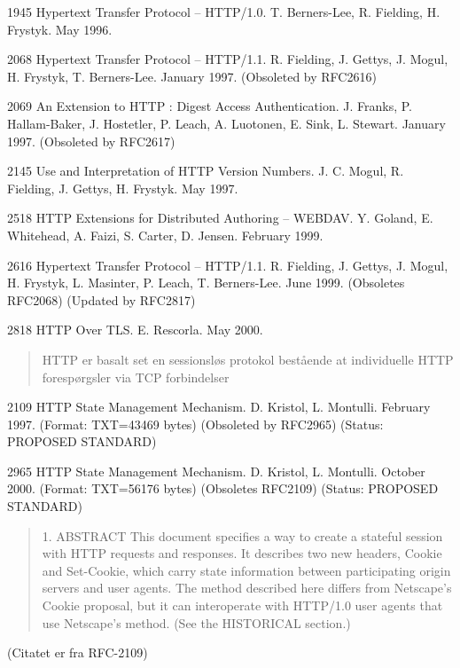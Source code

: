\documentclass[Screen16to9,17pt]{foils}
\begin{document}
\begin{list2}
\item[1945] Hypertext Transfer Protocol -- HTTP/1.0. T. Berners-Lee, R.
     Fielding, H. Frystyk. May 1996.
\item[2068] Hypertext Transfer Protocol -- HTTP/1.1. R. Fielding, J. Gettys,
     J. Mogul, H. Frystyk, T. Berners-Lee. January 1997. (Obsoleted by
     RFC2616)
\item[2069] An Extension to HTTP : Digest Access Authentication. J. Franks,
     P. Hallam-Baker, J. Hostetler, P. Leach, A. Luotonen, E. Sink, L.
     Stewart. January 1997. (Obsoleted by
     RFC2617)
\item[2145] Use and Interpretation of HTTP Version Numbers. J. C. Mogul, R.
     Fielding, J. Gettys, H. Frystyk. May 1997.
\item[2518] HTTP Extensions for Distributed Authoring -- WEBDAV. Y. Goland,
     E. Whitehead, A. Faizi, S. Carter, D. Jensen. February 1999.
\item[2616] Hypertext Transfer Protocol -- HTTP/1.1. R. Fielding, J. Gettys,
     J. Mogul, H. Frystyk, L. Masinter, P. Leach, T. Berners-Lee. June
     1999. (Obsoletes
     RFC2068) (Updated by RFC2817)
\item[2818] HTTP Over TLS. E. Rescorla. May 2000.
\end{list2}

\begin{quote}
HTTP er basalt set en sessionsløs protokol bestående at individuelle
HTTP forespørgsler via TCP forbindelser
\end{quote}

\begin{list2}
\item[2109] HTTP State Management Mechanism. D. Kristol, L. Montulli.
     February 1997. (Format: TXT=43469 bytes) (Obsoleted by RFC2965)
     (Status: PROPOSED STANDARD)
\item[2965] HTTP State Management Mechanism. D. Kristol, L. Montulli. October
     2000. (Format: TXT=56176 bytes) (Obsoletes RFC2109) (Status: PROPOSED
     STANDARD)
\end{list2}
\begin{quote}
1.  ABSTRACT
   This document specifies a way to create a stateful session with HTTP
   requests and responses.  It describes two new headers, Cookie and
   Set-Cookie, which carry state information between participating
   origin servers and user agents.  The method described here differs
   from Netscape's Cookie proposal, but it can interoperate with
   HTTP/1.0 user agents that use Netscape's method.  (See the HISTORICAL
   section.)
\end{quote}

(Citatet er fra RFC-2109)



\slidenext
\end{document}
